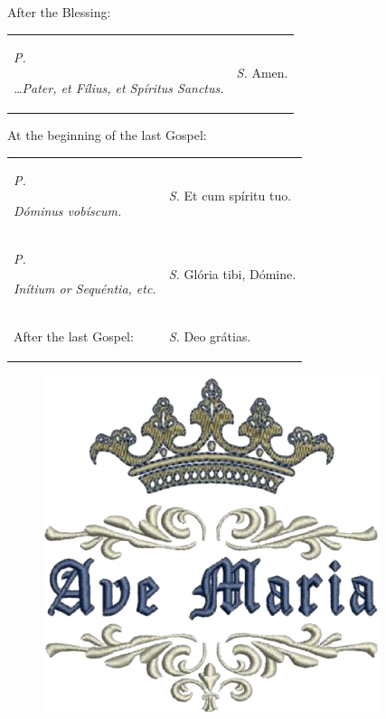 \documentclass[11pt]{amsbook}
\newcommand{\rubric}[1]{%
        \begin{footnotesize}
                \color{red}
                #1
        \end{footnotesize}
}
\newcommand{\server}[1]{%
        \noindent
        #1
}
\newcommand{\priest}[1]{%
        \begin{raggedright}
                \textit{\noindent\footnotesize #1}
        \end{raggedright}
}
\newcommand{\p}{%
        \noindent
        \textit{\color{red}\small P.}
}
\newcommand{\s}{%
        \noindent
        \textit{\color{red}\small S.}
}
\begin{document}
\vspace{-1.0em}

\begin{center}
        {\footnotesize\color{red}After the Blessing:}                              \\
\end{center}

\vspace{-1.0em}

\begin{longtable}{@{}p{2.25in}@{}p{2.25in}@{}} 
        \p \priest{\ldots Pater, et Fílius, et Spíritus Sanctus.} & \s \server{Amen.}                \\
\end{longtable}

\vspace{-1.0em}

\begin{center}
        {\footnotesize\color{red}At the beginning of the last Gospel:}             \\
\end{center}
        
\vspace{-1.0em}

\begin{longtable}{@{}p{2.25in}@{}p{2.25in}@{}} 
        \p \priest{Dóminus vobíscum.}                             & \s \server{Et cum spíritu tuo.}   \\
        \p \priest{Inítium or Sequéntia, etc.}                    & \s \server{Glória tibi, Dómine.} \\
        \rubric{After the last Gospel:}                           & \s \server{Deo grátias.}         \\
\end{longtable}

\begin{figure}[b]
        \includegraphics[scale=.28]{logo.png}
        \centering
        \vspace{1in}
\end{figure}
\end{document}
